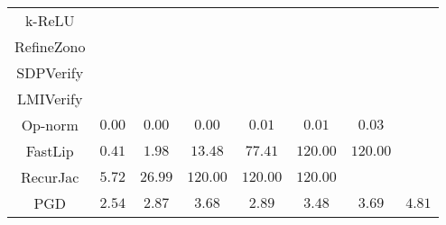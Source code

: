 \begin{table}
{\begin{tabular}{c|c|c|c|c|c|c|c}
       k-ReLU &               &               &               &               &               &               &               \\
   RefineZono &               &               &               &               &               &               &               \\
    SDPVerify &               &               &               &               &               &               &               \\
    LMIVerify &               &               &               &               &               &               &               \\
      Op-norm &        $0.00$ &        $0.00$ &        $0.00$ &        $0.01$ &        $0.01$ &        $0.03$ &               \\
      FastLip &        $0.41$ &        $1.98$ &       $13.48$ &       $77.41$ &      $120.00$ &      $120.00$ &               \\
     RecurJac &        $5.72$ &       $26.99$ &      $120.00$ &      $120.00$ &      $120.00$ &               &               \\
\hline
          PGD &        $2.54$ &        $2.87$ &        $3.68$ &        $2.89$ &        $3.48$ &        $3.69$ &        $4.81$ \\

    \bottomrule
    \end{tabular}
    \label{table:exp-A-average-radius-time-cifar10-0}
    }
\end{table}
        

